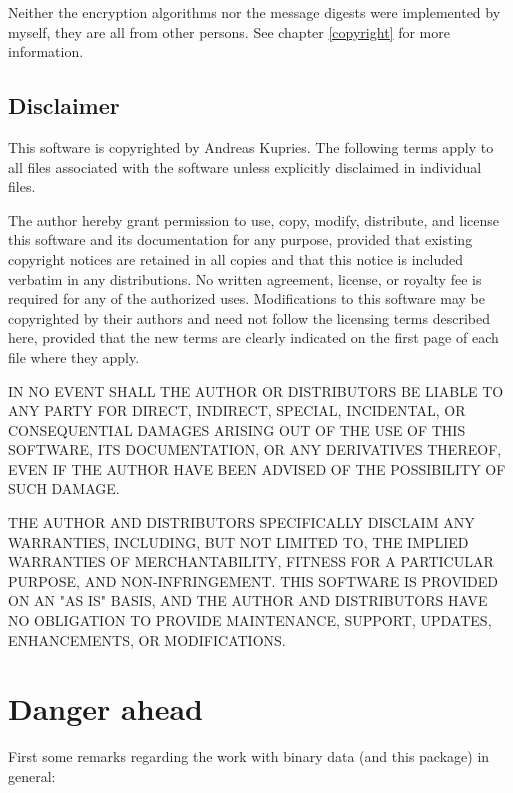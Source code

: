 \documentclass {report}
\begin{document}
Neither the encryption algorithms nor the message digests were
implemented by myself, they are all from other persons. See chapter
\ref {copyright} for more information.

\section {Disclaimer}

This software is copyrighted by Andreas Kupries.  The following
terms apply to all files associated with the software unless explicitly
disclaimed in individual files.

The author hereby grant permission to use, copy, modify, distribute,
and license this software and its documentation for any purpose, provided
that existing copyright notices are retained in all copies and that this
notice is included verbatim in any distributions. No written agreement,
license, or royalty fee is required for any of the authorized uses.
Modifications to this software may be copyrighted by their authors
and need not follow the licensing terms described here, provided that
the new terms are clearly indicated on the first page of each file where
they apply.

IN NO EVENT SHALL THE AUTHOR OR DISTRIBUTORS BE LIABLE TO ANY PARTY
FOR DIRECT, INDIRECT, SPECIAL, INCIDENTAL, OR CONSEQUENTIAL DAMAGES
ARISING OUT OF THE USE OF THIS SOFTWARE, ITS DOCUMENTATION, OR ANY
DERIVATIVES THEREOF, EVEN IF THE AUTHOR HAVE BEEN ADVISED OF THE
POSSIBILITY OF SUCH DAMAGE.

THE AUTHOR AND DISTRIBUTORS SPECIFICALLY DISCLAIM ANY WARRANTIES,
INCLUDING, BUT NOT LIMITED TO, THE IMPLIED WARRANTIES OF MERCHANTABILITY,
FITNESS FOR A PARTICULAR PURPOSE, AND NON-INFRINGEMENT.  THIS SOFTWARE
IS PROVIDED ON AN "AS IS" BASIS, AND THE AUTHOR AND DISTRIBUTORS HAVE
NO OBLIGATION TO PROVIDE MAINTENANCE, SUPPORT, UPDATES, ENHANCEMENTS, OR
MODIFICATIONS.


\chapter {Danger ahead}

First some remarks regarding the work with binary data (and this
package) in general:
\end{document}
